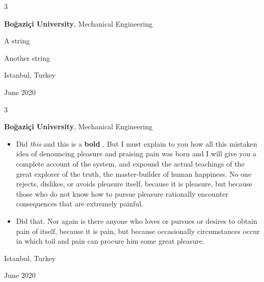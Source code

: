 \documentclass[10pt, letterpaper]{article}
\newenvironment{summary}{
    \begin{description}[
        topsep=0.10 cm,
        parsep=0.10 cm,
        partopsep=0pt,
        itemsep=0pt,
        leftmargin=0.4 cm + 10pt
    ]
}{
    \end{description}
} %
\newenvironment{highlights}{
    \begin{itemize}[
        topsep=0.10 cm,
        parsep=0.10 cm,
        partopsep=0pt,
        itemsep=0pt,
        leftmargin=0.4 cm + 10pt
    ]
}{
    \end{itemize}
} %
\newenvironment{threecolentry}[3][]{
    \onecolentry
    \def\thirdColumn{#3}
    \setcolumnwidth{1 cm, \fill, 4.5 cm}
    \begin{paracol}{3}
    {\raggedright #2} \switchcolumn
}{
    \switchcolumn \raggedleft \thirdColumn
    \end{paracol}
    \endonecolentry
} %
\let\hrefWithoutArrow\href
\renewcommand{\href}[2]{\hrefWithoutArrow{#1}{\ifthenelse{\equal{#2}{}}{ }{#2 }\raisebox{.15ex}{\footnotesize \faExternalLink*}}}
\begin{document}
        \vspace{0.2 cm}

        \begin{threecolentry}{\textbf{}}{
            Istanbul, Turkey

        June 2020
        }
            \textbf{Boğaziçi University}, Mechanical Engineering
            \begin{summary}
                \item A string
                \item Another string
            \end{summary}
        \end{threecolentry}

        \vspace{0.2 cm}

        \begin{threecolentry}{\textbf{}}{
            Istanbul, Turkey

        June 2020
        }
            \textbf{Boğaziçi University}, Mechanical Engineering
            \begin{highlights}
                \item Did \textit{this} and this is a \textbf{bold} \href{https://example.com}{link}. But I must explain to you how all this mistaken idea of denouncing pleasure and praising pain was born and I will give you a complete account of the system, and expound the actual teachings of the great explorer of the truth, the master-builder of human happiness. No one rejects, dislikes, or avoids pleasure itself, because it is pleasure, but because those who do not know how to pursue pleasure rationally encounter consequences that are extremely painful.
                \item Did that. Nor again is there anyone who loves or pursues or desires to obtain pain of itself, because it is pain, but because occasionally circumstances occur in which toil and pain can procure him some great pleasure.
            \end{highlights}
        \end{threecolentry}

        \vspace{0.2 cm}
\end{document}
